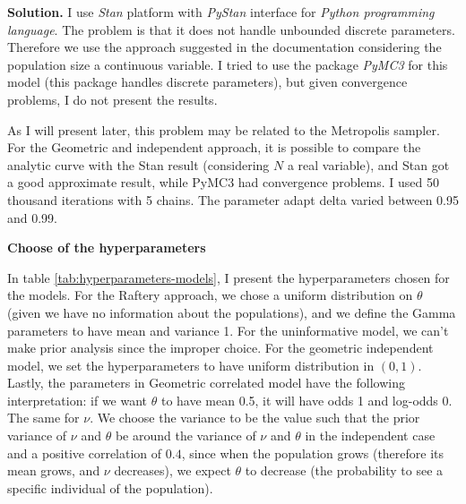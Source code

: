 \vspace{2ex}

    {\bf Solution.} I use {\em Stan} platform with {\em PyStan} interface for
    {\em Python programming language}. The problem is that it does not handle
    unbounded discrete parameters. Therefore we use the approach suggested in
    the documentation \cite[]{stan} considering the population size a continuous
    variable. I tried to use the package {\em PyMC3} for this model (this
    package handles discrete parameters), but given convergence problems,
    I do not present the results. 
    
    \ind As I will present later, this problem
    may be related to the Metropolis sampler. For the Geometric and
    independent approach, it is possible to compare the analytic curve with
    the 
    Stan result (considering $N$ a real variable), and Stan got a good
    approximate result, while PyMC3 had convergence problems. I used 50
    thousand iterations with 5 chains. The parameter adapt delta varied
    between 0.95 and 0.99. 

    \vspace{2ex}

    {\bf Choose of the hyperparameters}

    \vspace{2ex}

    \ind In table \ref{tab:hyperparameters-models}, I present the hyperparameters
    chosen for the models. For the Raftery approach, we chose a
    uniform distribution on $\theta$ (given we have no information about the
    populations), and we define the Gamma parameters to have mean and variance
    1. For the uninformative model, we can't make prior analysis since the
    improper choice. For the geometric independent model, we set the
    hyperparameters to have uniform distribution in $(0,1)$. Lastly, the
    parameters in Geometric correlated model have the following
    interpretation: if we want $\theta$ to have mean 0.5, it will have odds 1
    and log-odds 0. The same for $\nu$. We choose the variance to be the value
    such that the prior variance
    of $\nu$ and $\theta$ be around the variance of $\nu$ and $\theta$ in the independent case and a positive correlation of $0.4$, since when the population grows
    (therefore its mean grows, and $\nu$ decreases), we expect $\theta$ to
    decrease (the probability to see a specific individual of the population). 

    \vspace{2ex}

